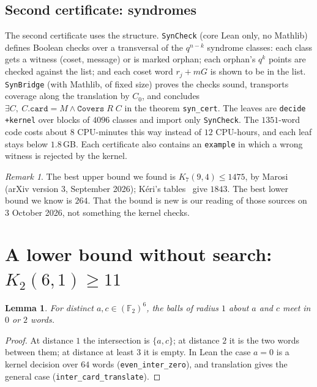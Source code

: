 \documentclass[11pt]{amsart}
\newtheorem{lemma}[theorem]{Lemma}
\theoremstyle{definition}
\theoremstyle{remark}
\newtheorem*{remark}{Remark}
\begin{document}
\subsection*{Second certificate: syndromes}
The second certificate uses the structure.
\texttt{SynCheck} (core Lean only, no Mathlib) defines Boolean checks over a transversal of the $q^{n-k}$ syndrome classes: each class gets a witness (coset, message) or is marked orphan; each orphan's $q^k$ points are checked against the list; and each coset word $r_j+mG$ is shown to be in the list.
\texttt{SynBridge} (with Mathlib, of fixed size) proves the checks sound, transports coverage along the translation by $C_0$, and concludes $\exists C,\ C.\mathtt{card}=M\wedge\texttt{Covers}\;R\;C$ in the theorem \texttt{syn\_\allowbreak cert}.
The leaves are \texttt{decide +kernel} over blocks of $4096$ classes and import only \texttt{SynCheck}.
The $1351$-word code costs about $8$ CPU-minutes this way instead of $12$ CPU-hours, and each leaf stays below $1.8$\,GB.
Each certificate also contains an \texttt{example} in which a wrong witness is rejected by the kernel.

\begin{remark}
The best upper bound we found is $K_7(9,4)\le 1475$, by Marosi~\cite{marosi2026} (arXiv version 3, September 2026); Kéri's tables~\cite{keri} give $1843$.
The best lower bound we know is $264$.
That the bound is new is our reading of those sources on 3 October 2026, not something the kernel checks.
\end{remark}

\section{A lower bound without search: $K_2(6,1)\ge 11$}

\begin{lemma}\label{lem:even}
For distinct $a,c\in(\mathbb{F}_2)^6$, the balls of radius $1$ about $a$ and $c$ meet in $0$ or $2$ words.
\end{lemma}
\begin{proof}
At distance $1$ the intersection is $\{a,c\}$; at distance $2$ it is the two words between them; at distance at least $3$ it is empty.
In Lean the case $a=0$ is a kernel decision over $64$ words (\texttt{even\_\allowbreak inter\_\allowbreak zero}), and translation gives the general case (\texttt{inter\_\allowbreak card\_\allowbreak translate}).
\end{proof}
\end{document}
